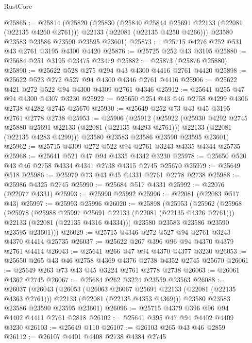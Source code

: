 \begin{lexlean}{RustCore}
\begin{coremodule}
@25865 := @25814
    (@25820
      (@25830
        (@25840 @25844 @25691 @22133 (@22081 (@22135 @4260 @2761)))
        @22133
        (@22081 (@22135 @4250 @4266)))
      @23580
      @23583
      @23586
      @23590
      @23595
      @23601)
@25873 := @25715 @4276 @252 @531 @43 @2761 @3195 @4300 @4420
@25876 := @25725 @252 @43 @3195
@25880 := @25684 @251 @3195 @23475 @23479
@25882 := @25873 (@25876 @25880)
@25890 := @25622 @528 @275 @294 @43 @4300 @4416 @2761 @4420
@25898 := @25622 @523 @272 @527 @94 @4300 @4346 @2761 @4416
@25906 := @25622 @421 @272 @522 @94 @4300 @4309 @2761 @4346
@25912 := @25641 @255 @47 @94 @4300 @4307 @3230
@25922 := @25650 @254 @43 @46 @2758 @4299 @4306 @2738 @4282 @2745 @25670
@25930 := @25649 @252 @73 @43 @45 @3195 @2761 @2778 @2738
@25953 := @25906
    (@25912
      (@25922
        (@25930 @4292 @2745 @25880 @25691 @22133 (@22081 (@22135 @4293 @2761)))
        @22133
        (@22081 (@22135 @4283 @4299)))
      @23580
      @23583
      @23586
      @23590
      @23595
      @23601)
@25962 := @25715 @4309 @272 @522 @94 @2761 @3243 @4335 @4344 @25735
@25968 := @25641 @521 @47 @94 @4335 @4342 @3230
@25978 := @25650 @520 @43 @46 @2758 @4334 @4341 @2738 @4315 @2745 @25670
@25979 := @25649 @518
@25986 := @25979 @73 @43 @45 @4331 @2761 @2778 @2738
@25988 := @25986 @4325 @2745
@25990 := @25684 @517 @4331
@25992 := @22076 (@22077 @4331)
@25993 := @25990 @25992
@25996 := @22081 (@22083 @517 @43)
@25997 := @25993 @25996
@26020 := @25898
    (@25953
      (@25962
        (@25968
          (@25978
            (@25988 @25997 @25691 @22133 (@22081 (@22135 @4326 @2761)))
            @22133
            (@22081 (@22135 @4316 @4334)))
          @23580
          @23583
          @23586
          @23590
          @23595
          @23601)))
@26029 := @25715 @4346 @272 @527 @94 @2761 @3243 @4370 @4414 @25735
@26037 := @25622 @267 @396 @96 @94 @4370 @4379 @2761 @4414
@26043 := @25641 @266 @47 @94 @4370 @4377 @3230
@26053 := @25650 @265 @43 @46 @2758 @4369 @4376 @2738 @4352 @2745 @25670
@26061 := @25649 @263 @73 @43 @45 @3224 @2761 @2778 @2738
@26063 := @26061 @4362 @2745
@26067 := @25684 @262 @3224 @23559 @23563
@26088 := @26037
    (@26043
      (@26053
        (@26063 @26067 @25691 @22133 (@22081 (@22135 @4363 @2761)))
        @22133
        (@22081 (@22135 @4353 @4369)))
      @23580
      @23583
      @23586
      @23590
      @23595
      @23601)
@26096 := @25715 @4379 @396 @96 @94 @4402 @4411 @2761 @2818
@26102 := @25641 @395 @47 @94 @4402 @4409 @3230
@26103 := @25649 @110
@26107 := @26103 @265 @43 @46 @2859
@26112 := @26107 @4401 @4408 @2738 @4384 @2745

\end{coremodule}
\end{lexlean}
